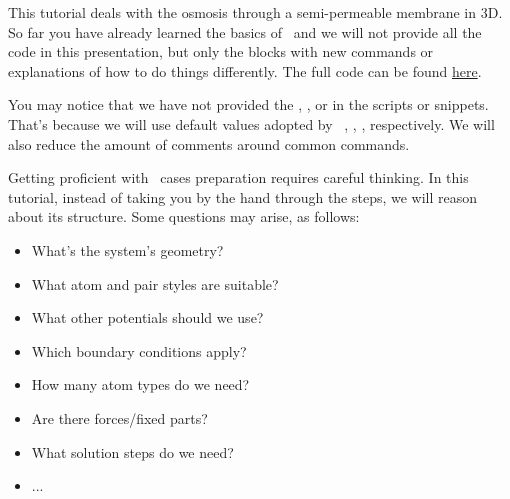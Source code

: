 \begin{frame}[fragile]{\secname}
This tutorial deals with the osmosis through a semi-permeable membrane in 3D. So far you have already learned the basics of \LAMMPS\ and we will not provide all the code in this presentation, but only the blocks with new commands or explanations of how to do things differently. The full code can be found \href{https://github.com/WallyTutor/learning-scientific-computing/tree/main/molecular-dynamics/lammps/tutorials-simon-gravelle/02-Permeable-Membrane}{here}.

\vspace{0.5cm}

You may notice that we have not provided the , , or  in the scripts or snippets. That's because we will use default values adopted by \LAMMPS\, , , , respectively. We will also reduce the amount of comments around common commands.
\end{frame}

\begin{frame}[fragile]{\secname}
Getting proficient with \LAMMPS\ cases preparation requires careful thinking. In this tutorial, instead of taking you by the hand through the steps, we will reason about its structure. Some questions may arise, as follows:

\vspace{0.5cm}

\begin{itemize}
\item What's the system's geometry?
\item What atom and pair styles are suitable?
\item What other potentials should we use?
\item Which boundary conditions apply?
\item How many atom types do we need?
\item Are there forces/fixed parts?
\item What solution steps do we need?
\item ...
\end{itemize}
\end{frame}

